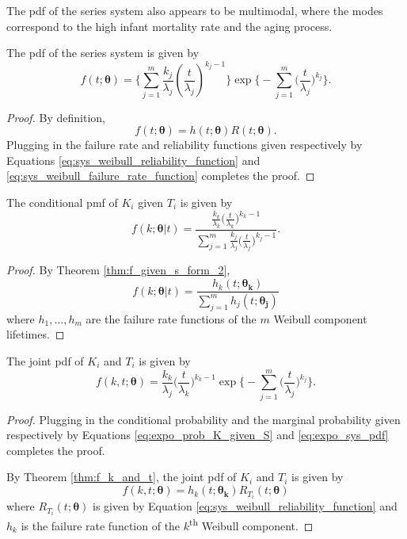 \documentclass[
]{article}
\begin{document}
The pdf of the series system also appears to be multimodal, where the
modes correspond to the high infant mortality rate and the aging
process.

The pdf of the series system is given by \begin{equation}
\label{eq:sys_weibull_pdf}
f(t;\boldsymbol{\theta}) =
\biggl\{
    \sum_{j=1}^m \frac{k_j}{\lambda_j}\left(\frac{t}{\lambda_j}\right)^{k_j-1}
\biggr\}
\exp
\biggl\{
    -\sum_{j=1}^m \bigl(\frac{t}{\lambda_j}\bigr)^{k_j}
\biggr\}.
\end{equation}

\begin{proof}
By definition,
$$
f(t;\boldsymbol{\theta}) = h(t;\boldsymbol{\theta}) R(t;\boldsymbol{\theta}).
$$
Plugging in the failure rate and reliability functions given respectively by
Equations \eqref{eq:sys_weibull_reliability_function} and
\eqref{eq:sys_weibull_failure_rate_function} completes the proof.
\end{proof}

The conditional pmf of \(K_i\) given \(T_i\) is given by
\begin{equation}
\label{eq:weibull_pmf_k_given_s}
f(k;\boldsymbol{\theta}|t) = \frac{\frac{k_k}{\lambda_k}\bigl(\frac{t}{\lambda_k}\bigr)^{k_k-1}}
    {\sum_{j=1}^m \frac{k_j}{\lambda_j}\bigl(\frac{t}{\lambda_j}\bigr)^{k_j-1}}.
\end{equation}

\begin{proof}
By Theorem \ref{thm:f_given_s_form_2},
$$
f(k;\boldsymbol{\theta}|t) = \frac{h_k(t;\boldsymbol{\theta_k})}{\sum_{j=1}^m h_j(t;\boldsymbol{\theta_j})}
$$
where $h_1,\ldots,h_m$ are the failure rate functions of the $m$ Weibull
component lifetimes.
\end{proof}

The joint pdf of \(K_i\) and \(T_i\) is given by \begin{equation}
\label{eq:weibull_joint_k_s}
f(k,t;\boldsymbol{\theta}) = \frac{k_k}{\lambda_j}\biggl(\frac{t}{\lambda_k}\biggr)^{k_k-1}
\exp\biggl\{-\sum_{j=1}^{m}\biggl(\frac{t}{\lambda_j}\biggr)^{k_j}\biggr\}.
\end{equation}

\begin{proof}
Plugging in the conditional probability and the marginal probability given
respectively by Equations \eqref{eq:expo_prob_K_given_S} and
\eqref{eq:expo_sys_pdf} completes the proof.

By Theorem \ref{thm:f_k_and_t}, the joint pdf of $K_i$ and $T_i$ is given by
$$
f(k,t;\boldsymbol{\theta}) = h_k(t;\boldsymbol{\theta_k}) R_{T_i}(t;\boldsymbol{\theta})
$$
where $R_{T_i}(t;\boldsymbol{\theta})$ is given by Equation
\eqref{eq:sys_weibull_reliability_function} and $h_k$ is the failure rate
function of the $k$\textsuperscript{th} Weibull component.
\end{proof}
\end{document}
